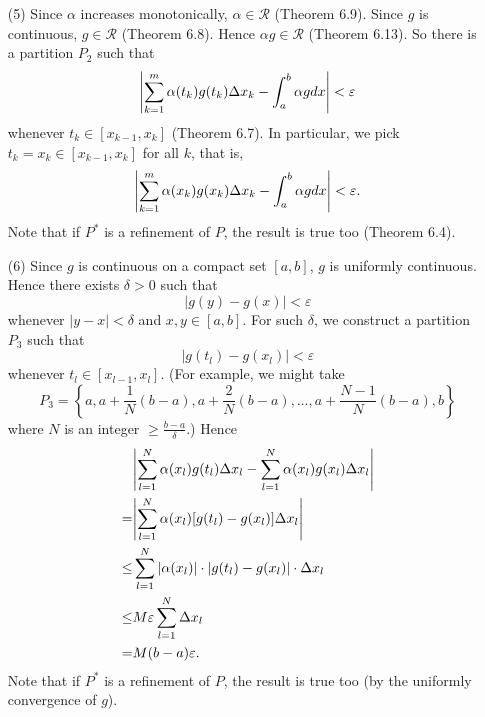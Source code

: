\documentclass{article}
\begin{document}
\begin{enumerate}
  \item[(5)]
  Since $\alpha$ increases monotonically, $\alpha \in \mathscr{R}$ (Theorem 6.9).
  Since $g$ is continuous, $g \in \mathscr{R}$ (Theorem 6.8).
  Hence $\alpha g \in \mathscr{R}$ (Theorem 6.13).
  So there is a partition $P_2$ such that
  \[
    \abs{\sum_{k=1}^{m} \alpha(t_k)g(t_k) \Delta x_k - \int_{a}^{b} \alpha g dx }
    < \varepsilon
  \]
  whenever $t_k \in [x_{k-1},x_k]$ (Theorem 6.7).
  In particular, we pick $t_k = x_k \in [x_{k-1},x_k]$ for all $k$, that is,
  \[
    \abs{\sum_{k=1}^{m} \alpha(x_k)g(x_k) \Delta x_k - \int_{a}^{b} \alpha g dx }
    < \varepsilon.
  \]
  Note that if $P^{*}$ is a refinement of $P$, the result is true too (Theorem 6.4).

  \item[(6)]
  Since $g$ is continuous on a compact set $[a,b]$,
  $g$ is uniformly continuous.
  Hence there exists $\delta > 0$ such that
  \[
    |g(y) - g(x)| < \varepsilon
  \]
  whenever $|y - x| < \delta$ and $x, y \in [a,b]$.
  For such $\delta$, we construct a partition $P_3$ such that
  \[
    |g(t_l) - g(x_l)| < \varepsilon
  \]
  whenever $t_l \in [x_{l-1},x_l]$.
  (For example, we might take
  \[
    P_3 = \left\{
      a, a + \frac{1}{N}(b-a), a + \frac{2}{N}(b-a), \ldots,
      a + \frac{N-1}{N}(b-a), b
    \right\}
  \]
  where $N$ is an integer $\geq \frac{b-a}{\delta}$.)
  Hence
  \begin{align*}
    &\abs{ \sum_{l=1}^{N} \alpha(x_l)g(t_l) \Delta x_l
      - \sum_{l=1}^{N} \alpha(x_l)g(x_l) \Delta x_l } \\
    =&
    \abs{ \sum_{l=1}^{N} \alpha(x_l)[g(t_l)-g(x_l)] \Delta x_l } \\
    \leq&
    \sum_{l=1}^{N} |\alpha(x_l)| \cdot |g(t_l)-g(x_l)| \cdot \Delta x_l \\
    \leq&
    M \varepsilon \sum_{l=1}^{N} \Delta x_l \\
    =&
    M(b-a) \varepsilon.
  \end{align*}
  Note that if $P^{*}$ is a refinement of $P$, the result is true too
  (by the uniformly convergence of $g$).


\end{enumerate}
\end{document}
